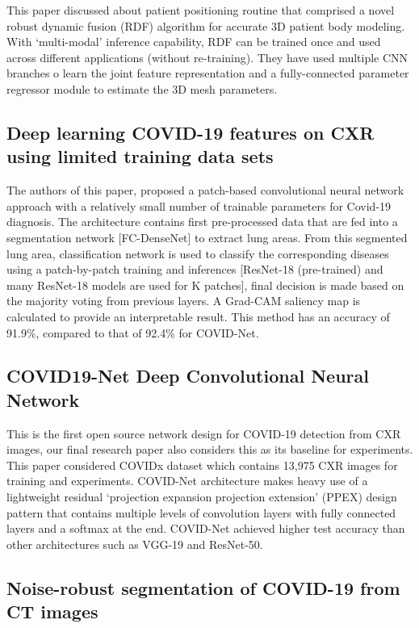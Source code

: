 \documentclass{sigkddExp}
\begin{document}
This paper \cite{9084097} discussed about patient positioning routine that
comprised a novel robust dynamic fusion (RDF) algorithm for accurate 3D patient
body modeling. With ‘multi-modal’ inference capability, RDF can be trained once
and used across different applications (without re-training). They have used
multiple CNN branches o learn the joint feature representation and a
fully-connected parameter regressor module to estimate the 3D mesh parameters.


\subsection{Deep learning COVID-19 features on CXR using limited training data sets}

The authors of this paper\cite{pmid32396075}, proposed a patch-based
convolutional neural network approach with a relatively small number of
trainable parameters for Covid-19 diagnosis. The architecture contains first
pre-processed data that are fed into a segmentation network [FC-DenseNet] to
extract lung areas. From this segmented lung area, classification network is
used to classify the corresponding diseases using a patch-by-patch training and
inferences [ResNet-18 (pre-trained) and many ResNet-18 models are used for K
patches], final decision is made based on the majority voting from previous
layers. A Grad-CAM saliency map is calculated to provide an interpretable
result. This method has an accuracy of 91.9\%, compared to that of 92.4\% for
COVID-Net.

\subsection{COVID19-Net Deep Convolutional Neural Network}

This is the first open source network design for COVID-19 detection from CXR images,
our final research paper also considers this as its baseline for experiments.
This paper considered COVIDx dataset which contains 13,975 CXR images for training and
experiments. COVID-Net architecture makes heavy use of a lightweight residual
‘projection expansion projection extension’ (PPEX) design pattern that contains multiple
levels of convolution layers with fully connected layers and a softmax at the end.
COVID-Net achieved higher test accuracy than other architectures such as VGG-19 and ResNet-50.

\subsection{Noise-robust segmentation of COVID-19 from CT images}
\end{document}
